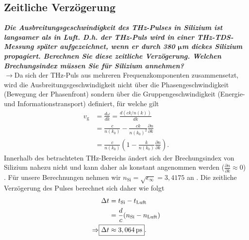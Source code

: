 \subsection{\label{subsec:FZV6}Zeitliche Verzögerung}
\textbf{\textit{Die Ausbreitungsgeschwindigkeit des THz-Pulses in Silizium ist langsamer als in
Luft. D.h. der THz-Puls wird in einer THz-TDS-Messung später aufgezeichnet,
wenn er durch 380 $\mathbf{\mu}$m dickes Silizium propagiert. Berechnen Sie diese zeitliche
Verzögerung. Welchen Brechungsindex müssen Sie für Silizium annehmen?}}\\
$\rightarrow$Da sich der THz-Puls aus mehreren Frequenzkomponenten zusammensetzt, wird 
die Ausbreitungsgeschwindigkeit nicht über die Phasengeschwindigkeit (Bewegung der Phasenfront)
sondern über die Gruppengeschwindigkeit (Energie- und Informationstransport) definiert,
für welche gilt
\begin{align}
    v_{\text{g}} &= \frac{d\omega}{dk} = \frac{d(ck/n(k))}{dk} \\
    &= \frac{c}{n(k_{0})} - \frac{ck}{n(k_{0})^{2}}\frac{\partial n}{\partial k} \\
    &= \frac{c}{n(k_{0})}\left(1 - \frac{k}{n(k_{0})}\frac{\partial n}{\partial k}\right).
\end{align}
Innerhalb des betrachteten THz-Bereichs ändert sich der Brechungsindex von Silizium nahezu nicht und kann 
daher als konstant angenommen werden ($\frac{\partial n}{\partial k}\approx0$) \cite{Q9}.
Für unsere Berechnungen nehmen wir $n_{\text{Si}} = \sqrt{\epsilon_{\infty}} = 3,4175$ an \cite{Anleitung}.
Die zeitliche Verzögerung des Pulses berechnet sich daher wie folgt
\begin{align}
    \Delta t &= t_{\text{Si}} - t_{\text{Luft}} \\
    &= \frac{d}{c}(n_{\text{Si}}-n_{\text{Luft}}) \label{eq:a22}\\
    \Rightarrow \Aboxed{\Delta t & \approx 3,064\,\si{ps}}.
\end{align}

